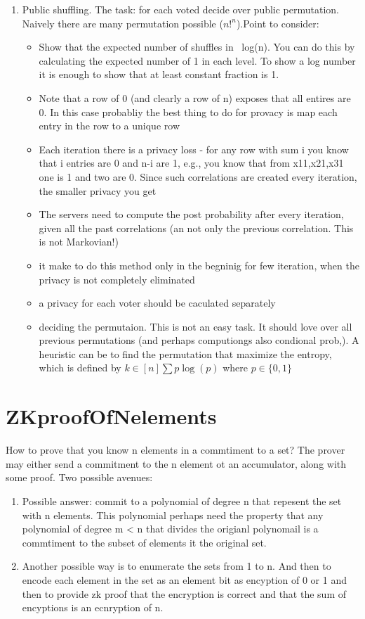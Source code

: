 \documentclass[]{paper}
\begin{document}
\begin{enumerate}
\item Public shuffling. The task: for each voted decide over public permutation. Naively there are many permutation possible (${n!}^n$).Point to consider:
\begin{itemize}
	\item 
	Show that the expected number of shuffles in ~log(n). You can do this by calculating the expected number of 1 in each level. To show a log number it is enough to show that at least constant fraction is 1.
	\item Note that a row of 0 (and clearly a row of n) exposes that all entires are 0. In this case probabliy the best thing to do  for provacy is map each entry in the row to a unique row
	\item Each iteration there is a privacy loss - for any row with sum i you know that i entries are 0 and n-i are 1, e.g., you know that from x11,x21,x31 one is 1 and two are 0. Since such correlations are created every iteration, the smaller privacy you get
	\item The servers need to compute the post probability after every iteration, given all the past correlations (an not only the previous correlation. This is not Markovian!)
	\item it make to do this method only in the begninig for few iteration, when the privacy is not completely eliminated
	\item a privacy for each voter should be caculated separately
	\item deciding the permutaion. This is not an easy task. It should love over all previous permutations (and perhaps computiongs also condional prob,). A heuristic can be to find the permutation that maximize the entropy, which is defined by $k\in [n]\sum p \log(p)$ where $p\in \{0,1\}$
	\end{itemize}
\end{enumerate}
\section{ZKproofOfNelements}
How to prove that you know n elements in a commtiment to a set? The prover may either send a commitment to the n element ot an accumulator, along with some proof. Two possible avenues:
\begin{enumerate}
	\item Possible answer: commit to a polynomial of degree n that repesent the set with n elements. This polynomial perhaps need the property that any polynomial of degree m < n that divides the origianl polynomail is a commtiment to the subset of elements it the original set. 
	\item Another possible way is to enumerate the sets from 1 to n. And then to encode each element in the set as an element bit as encyption of 0 or 1 and then to provide zk proof that the encryption is correct and that the sum of encyptions is an ecnryption of n.
\end{enumerate}
\end{document}

